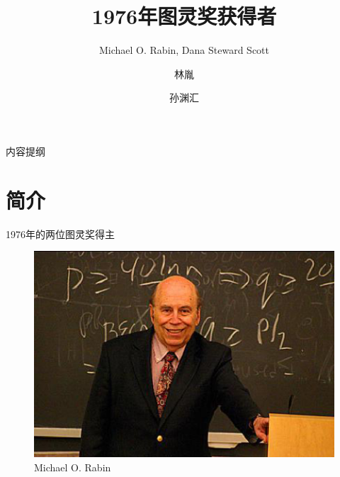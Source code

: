 \documentclass{beamer}
\title[图灵奖获得者介绍] %
{1976年图灵奖获得者}
\subtitle
{Michael O. Rabin,  Dana Steward Scott}
\author%
{林胤\and 孙渊汇}
\institute
{
  同济大学电子与信息学院
}
\begin{document}
\begin{frame}
  \titlepage %
\end{frame}
\begin{frame}{内容提纲}
  \tableofcontents
\end{frame}

\section{简介}
\begin{frame}{1976年的两位图灵奖得主}
	\begin{figure}[htbp]
		\begin{minipage}{0.4\textwidth}
			\centering\includegraphics[scale=0.3]{figures/lb2.eps}
			\caption*{Michael O. Rabin}
		\end{minipage}
		\begin{minipage}{0.4\textwidth}

\end{minipage}
\end{figure}
\end{frame}
\end{document}
